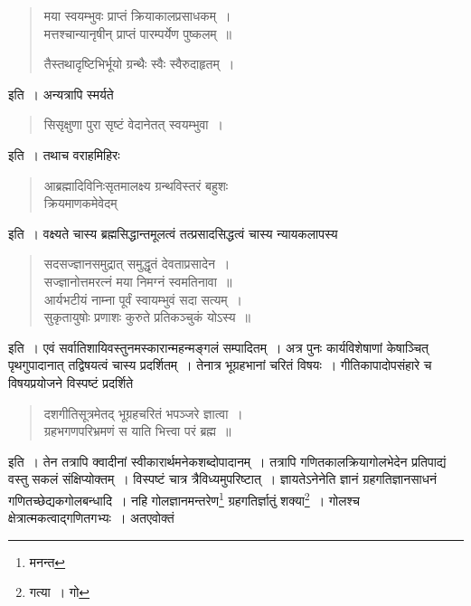 \documentclass[11pt, openany]{book}
\begin{document}
{\begin{quote}
{मया स्वयम्भुवः प्राप्तं क्रियाकालप्रसाधकम्~।\\
मत्तश्चान्यानृषीन् प्राप्तं पारम्पर्येण पुष्कलम्~॥

तैस्तथादृष्टिभिर्भूयो ग्रन्थैः स्वैः स्वैरुदाहृतम्~।}
\end{quote}

\noindent इति~। अन्यत्रापि स्मर्यते\textendash 

\begin{quote} 
{\qt सिसृक्षुणा पुरा सृष्टं वेदानेतत् स्वयम्भुवा~।}
\end{quote} 

\noindent इति~। तथाच वराहमिहिरः\textendash  

\begin{quote} 
{\qt आब्रह्मादिविनिःसृतमालक्ष्य ग्रन्थविस्तरं बहुशः\\
क्रियमाणकमेवेदम्}
\end{quote}

\newpage


\noindent इति~। वक्ष्यते चास्य ब्रह्मसिद्धान्तमूलत्वं तत्प्रसादसिद्धत्वं चास्य न्यायकलापस्य\textendash  
\begin{quote}
{\qt सदसज्ज्ञानसमुद्रात् समुद्धृतं देवताप्रसादेन~।\\
सज्ज्ञानोत्तमरत्नं मया निमग्नं स्वमतिनावा~॥\\
आर्यभटीयं नाम्ना पूर्वं स्वायम्भुवं सदा सत्यम्~।\\
सुकृतायुषोः प्रणाशः कुरुते प्रतिकञ्चुकं योऽस्य~॥}
\end{quote}
\noindent इति~। एवं सर्वातिशायिवस्तुनमस्कारान्महन्मङ्गलं सम्पादितम्~। अत्र पुनः कार्यविशेषाणां केषाञ्चित् पृथगुपादानात् तद्विषयत्वं चास्य प्रदर्शितम्~। तेनात्र भूग्रहभानां चरितं विषयः~। गीतिकापादोपसंहारे च विषयप्रयोजने विस्पष्टं प्रदर्शिते\textendash  

\begin{quote}
{\qt दशगीतिसूत्रमेतद् भूग्रहचरितं भपञ्जरे ज्ञात्वा~।\\
ग्रहभगणपरिभ्रमणं स याति भित्त्वा परं ब्रह्म~॥}
\end{quote}

\noindent इति~। तेन तत्रापि क्वादीनां स्वीकारार्थमनेकशब्दोपादानम्~। तत्रापि गणितकालक्रियागोलभेदेन प्रतिपाद्यं वस्तु सकलं संक्षिप्योक्तम्~। विस्पष्टं चात्र त्रैविध्यमुपरिष्टात्~। ज्ञायतेऽनेनेति ज्ञानं ग्रहगतिज्ञानसाधनं गणितच्छेद्यकगोलबन्धादि~। नहि गोलज्ञानमन्तरेण\renewcommand{\thefootnote}{१}\footnote{मनन्त} ग्रहगतिर्ज्ञातुं शक्या\renewcommand{\thefootnote}{२}\footnote{गत्या~। गो}~। गोलश्च क्षेत्रात्मकत्वाद्गणितगभ्यः~। अतएवोक्तं\textendash  

}
\end{document}
